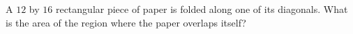 A $12$ by $16$ rectangular piece of paper is folded along one of its diagonals. What is the area of the region where the paper overlaps itself?

